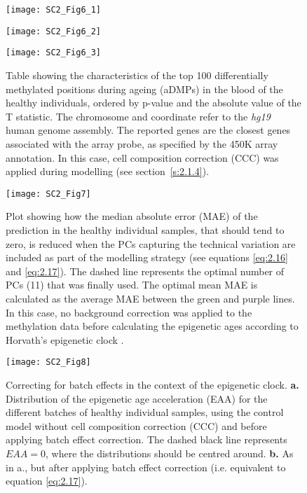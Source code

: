 \begin{figure}[htbp!]
	\centering    
	\texttt{[image: SC2\_Fig6\_1]}
\end{figure}
\begin{figure}[htbp!]
	\centering    
	\texttt{[image: SC2\_Fig6\_2]}
\end{figure}
\begin{figure}[htbp!]
	\centering    
	\texttt{[image: SC2\_Fig6\_3]}
	\caption[Table showing the top 100 aDMPs]{Table showing the characteristics of the top 100 differentially methylated positions during ageing (aDMPs) in the blood of the healthy individuals, ordered by p-value and the absolute value of the T statistic. The chromosome and coordinate refer to the \textit{hg19} human genome assembly. The reported genes are the closest genes associated with the array probe, as specified by the 450K array annotation. In this case, cell composition correction (CCC) was applied during modelling (see section~\ref{s:2.1.4}).}
	\label{fig:sc2_fig6}
\end{figure}	

\begin{figure}[htbp!] 
	\centering    
	\vspace*{3mm}
	\texttt{[image: SC2\_Fig7]}
	\caption[Impact of the absence of background correction on the predictions from the epigenetic clock]{Plot showing how the median absolute error (MAE) of the prediction in the healthy individual samples, that should tend to zero, is reduced when the PCs capturing the technical variation are included as part of the modelling strategy (see equations \ref{eq:2.16} and \ref{eq:2.17}). The dashed line represents the optimal number of PCs (11) that was finally used. The optimal mean MAE is calculated as the average MAE between the green and purple lines. In this case, no background correction was applied to the methylation data before calculating the epigenetic ages according to Horvath's epigenetic clock \cite{Horvath2013}.}
	\label{fig:sc2_fig7}
\end{figure}

\begin{figure}[htbp!] 
	\centering    
	\texttt{[image: SC2\_Fig8]}
	\caption[Correcting for batch effects: control model without cell composition correction]{Correcting for batch effects in the context of the epigenetic clock. \textbf{a.} Distribution of the epigenetic age acceleration (EAA) for the different batches of healthy individual samples, using the control model without cell composition correction (CCC) and before applying batch effect correction. The dashed black line represents $EAA = 0$, where the distributions should be centred around. \textbf{b.} As in a., but after applying batch effect correction (i.e. equivalent to equation \ref{eq:2.17}).}
	\label{fig:sc2_fig8}
\end{figure}

